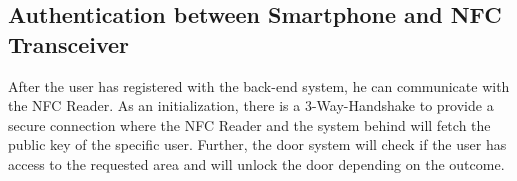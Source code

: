 \subsection{Authentication between Smartphone and NFC Transceiver}
After the user has registered with the back-end system, he can communicate with the NFC Reader. As an initialization, there is a 3-Way-Handshake to provide a secure connection where the NFC Reader and the system behind will fetch the public key of the specific user. Further, the door system will check if the user has access to the requested area and will unlock the door depending on the outcome.

